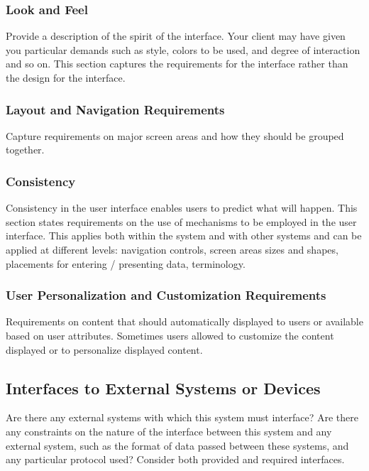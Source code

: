 \subsubsection{Look and Feel}

Provide a description of the spirit of the interface. Your client may have given you particular demands such as style, colors to be used, and degree of interaction and so on. This section captures the requirements for the interface rather than the design for the interface.

\subsubsection{Layout and Navigation Requirements}

Capture requirements on major screen areas and how they should be grouped together.

\subsubsection{Consistency}

Consistency in the user interface enables users to predict what will happen. This section states requirements on the use of mechanisms to be employed in the user interface. This applies both within the system and with other systems and can be applied at different levels: navigation controls, screen areas sizes and shapes, placements for entering / presenting data, terminology.

\subsubsection{User Personalization and Customization Requirements}

Requirements on content that should automatically displayed to users or available based on user attributes. Sometimes users allowed to customize the content displayed or to personalize displayed content.

\subsection{Interfaces to External Systems or Devices}

Are there any external systems with which this system must interface? Are there any constraints on the nature of the interface between this system and any external system, such as the format of data passed between these systems, and any particular protocol used? Consider both provided and required interfaces.

